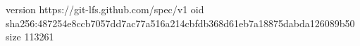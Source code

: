 version https://git-lfs.github.com/spec/v1
oid sha256:487254e8ccb7057dd7ac77a516a214cbfdb368d61eb7a18875dabda126089b50
size 113261
